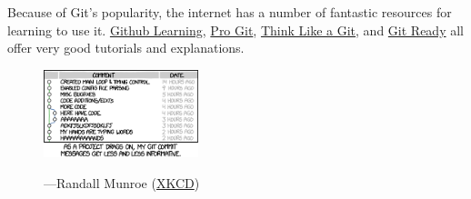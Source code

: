 Because of Git's popularity, the internet has a number of fantastic resources for learning to use it. \href{http://learn.Github.com/p/index.html}{Github Learning}, \href{http://git-scm.com/book}{Pro Git}, \href{http://think-like-a-git.net/}{Think Like a Git}, and \href{http://gitready.com/}{Git Ready} all offer very good tutorials and explanations.

\vfill

\begin{figure}[h!]
  \centering
  \includegraphics[width=0.4\textwidth]{figures/git_commit.png}

  \hspace*{\fill}---Randall Munroe (\href{https://xkcd.com/1296/}{XKCD})
\end{figure}
